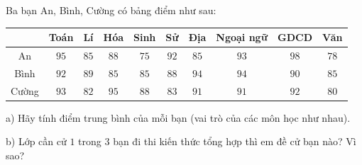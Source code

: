 \begin{ex}
Ba bạn An, Bình, Cường có bảng điểm như sau:
\begin{center}
\begin{tabular}{|c|c|c|c|c|c|c|c|c|c|}\hline
 & Toán & Lí & Hóa & Sinh & Sử & Địa & Ngoại ngữ & GDCD & Văn\\\hline
An & $95$ & $85$ & $88$ & $75$ & $92$ & $85$ & $93$ & $98$ & $78$\\\hline
Bình & $92$ & $89$ & $85$ & $85$ & $88$ & $94$ & $94$ & $90$ & $85$\\\hline
Cường & $93$ & $82$ & $95$ & $88$ & $83$ & $91$ & $91$ & $92$ & $80$\\\hline
\end{tabular}
\end{center}
a) Hãy tính điểm trung bình của mỗi bạn (vai trò của các môn học như nhau).

b) Lớp cần cử $1$ trong $3$ bạn đi thi kiến thức tổng hợp thì em đề cử bạn nào? Vì sao?
\end{ex}
